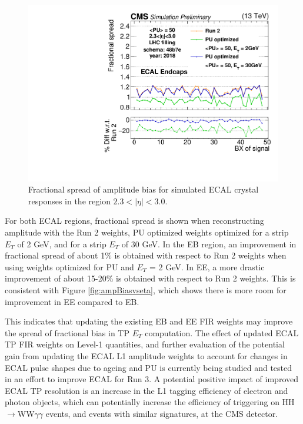 \begin{figure}[H]
    \centering
    \includegraphics[width=\textwidth]{Images/ECAL/TPG/gr_train_nonzero_Asf_48b7e_26_28_std.pdf}
    \caption{Fractional spread of amplitude bias for simulated ECAL crystal responses in the region $2.3 < |\eta| < 3.0$.}
    \label{fig:gr_train_nonzero_Asf_48b7e_26_28_std}
\end{figure}

For both ECAL regions, fractional spread is shown when reconstructing amplitude with the Run 2 weights, PU optimized weights optimized for a strip $E_{T}$ of 2 GeV, and for a strip $E_{T}$ of 30 GeV. In the EB region, an improvement in fractional spread of about 1\% is obtained with respect to Run 2 weights when using weights optimized for PU and $E_{T}$ = 2 GeV. In EE, a more drastic improvement of about 15-20\% is obtained with respect to Run 2 weights. This is consistent with Figure \ref{fig:ampBiasvseta}, which shows there is more room for improvement in EE compared to EB. 

This indicates that updating the existing EB and EE FIR weights may improve the spread of fractional bias in TP $E_{T}$ computation. The effect of updated ECAL TP FIR weights on Level-1 quantities, and further evaluation of the potential gain from updating the ECAL L1 amplitude weights to account for changes in ECAL pulse shapes due to ageing and PU is currently being studied and tested in an effort to improve ECAL for Run 3. A potential positive impact of improved ECAL TP resolution is an increase in the L1 tagging efficiency of electron and photon objects, which can potentially increase the efficiency of triggering on HH$\rightarrow$WW$\gamma\gamma$ events, and events with similar signatures, at the CMS detector. 

